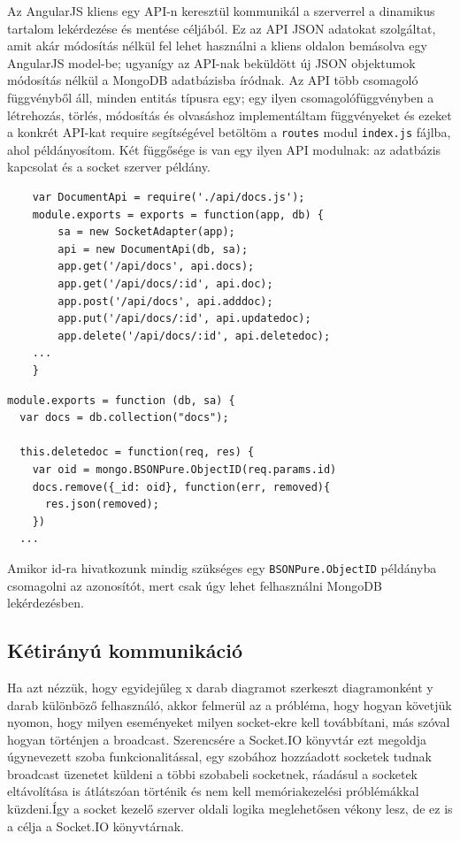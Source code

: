 Az AngularJS kliens egy API-n keresztül kommunikál a szerverrel a dinamikus tartalom lekérdezése és mentése céljából. Ez az API JSON adatokat szolgáltat, amit akár módosítás nélkül fel lehet használni a kliens oldalon bemásolva egy AngularJS model-be; ugyanígy az API-nak beküldött új JSON objektumok módosítás nélkül a MongoDB adatbázisba íródnak. Az API több csomagoló függvényből áll, minden entitás típusra egy; egy ilyen csomagolófüggvényben a létrehozás, törlés, módosítás és olvasáshoz implementáltam függvényeket és ezeket a konkrét API-kat require segítségével betöltöm a \lstinline{routes} modul \lstinline{index.js} fájlba, ahol példányosítom. Két függősége is van egy ilyen API modulnak: az adatbázis kapcsolat és a socket szerver példány.

\begin{lstlisting}
    var DocumentApi = require('./api/docs.js');
    module.exports = exports = function(app, db) {
        sa = new SocketAdapter(app);
        api = new DocumentApi(db, sa);
        app.get('/api/docs', api.docs);
        app.get('/api/docs/:id', api.doc);
        app.post('/api/docs', api.adddoc);
        app.put('/api/docs/:id', api.updatedoc);
        app.delete('/api/docs/:id', api.deletedoc);
    ...
    }

\end{lstlisting}

\begin{lstlisting}
module.exports = function (db, sa) {
  var docs = db.collection("docs");

  this.deletedoc = function(req, res) {
    var oid = mongo.BSONPure.ObjectID(req.params.id)
    docs.remove({_id: oid}, function(err, removed){
      res.json(removed);
    })  
  ...

\end{lstlisting}

Amikor id-ra hivatkozunk mindig szükséges egy \lstinline{BSONPure.ObjectID} példányba csomagolni az azonosítót, mert csak úgy lehet felhasználni MongoDB lekérdezésben.

\subsection{Kétirányú kommunikáció}

Ha azt nézzük, hogy egyidejűleg x darab diagramot szerkeszt diagramonként y darab különböző felhasználó, akkor felmerül az a próbléma, hogy hogyan követjük nyomon, hogy milyen eseményeket milyen socket-ekre kell továbbítani, más szóval hogyan történjen a broadcast. Szerencsére a Socket.IO könyvtár ezt megoldja úgynevezett szoba funkcionalitással, egy szobához hozzáadott socketek tudnak broadcast üzenetet küldeni a többi szobabeli socketnek, ráadásul a socketek eltávolítása is átlátszóan történik és nem kell memóriakezelési próblémákkal küzdeni.Így a socket kezelő szerver oldali logika meglehetősen vékony lesz, de ez is a célja a Socket.IO könyvtárnak. 

